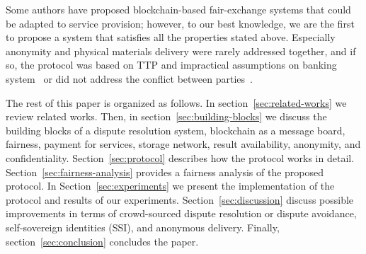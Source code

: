 
Some authors have proposed blockchain-based fair-exchange systems that could be adapted to service provision; however, to our best knowledge, we are the first to propose a system that satisfies all the properties stated above. Especially anonymity and physical materials delivery were rarely addressed together, and if so, the protocol was based on TTP and impractical assumptions on banking system~\cite{birjoveanuAnonymityFairexchangeEcommerce2015} or did not address the conflict between parties~\cite{altawyLelantosBlockchainBasedAnonymous2017}.


The rest of this paper is organized as follows.
In section~\ref{sec:related-works} we review related works. 
Then, in section~\ref{sec:building-blocks} we discuss the building blocks of a dispute resolution system, blockchain as a message board, fairness, payment for services, storage network, result availability, anonymity, and confidentiality.
Section~\ref{sec:protocol} describes how the protocol works in detail.
Section~\ref{sec:fairness-analysis} provides a fairness analysis of the proposed protocol.
In Section~\ref{sec:experiments} we present the implementation of the protocol and results of our experiments.
Section~\ref{sec:discussion} discuss possible improvements in terms of crowd-sourced dispute resolution or dispute avoidance, self-sovereign identities (SSI), and anonymous delivery.
Finally, section~\ref{sec:conclusion} concludes the paper.


